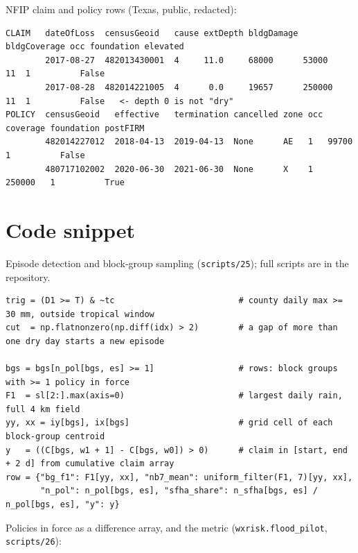 \documentclass[11pt]{article}
\newcommand{\tc}[1]{\texttt{#1}}
\begin{document}
NFIP claim and policy rows (Texas, public, redacted):

\begin{lstlisting}[basicstyle=\ttfamily\scriptsize,language={}]
CLAIM   dateOfLoss  censusGeoid   cause extDepth bldgDamage bldgCoverage occ foundation elevated
        2017-08-27  482013430001  4     11.0     68000      53000        11  1          False
        2017-08-28  482014221005  4      0.0     19657      250000       11  1          False   <- depth 0 is not "dry"
POLICY  censusGeoid   effective   termination cancelled zone occ coverage foundation postFIRM
        482014227012  2018-04-13  2019-04-13  None      AE   1   99700    1          False
        480717102002  2020-06-30  2021-06-30  None      X    1   250000   1          True
\end{lstlisting}

\section{Code snippet}

Episode detection and block-group sampling (\tc{scripts/25}); full scripts are in the repository.

\begin{lstlisting}
trig = (D1 >= T) & ~tc                         # county daily max >= 30 mm, outside tropical window
cut  = np.flatnonzero(np.diff(idx) > 2)        # a gap of more than one dry day starts a new episode

bgs = bgs[n_pol[bgs, es] >= 1]                 # rows: block groups with >= 1 policy in force
F1  = sl[2:].max(axis=0)                       # largest daily rain, full 4 km field
yy, xx = iy[bgs], ix[bgs]                      # grid cell of each block-group centroid
y   = ((C[bgs, w1 + 1] - C[bgs, w0]) > 0)      # claim in [start, end + 2 d] from cumulative claim array
row = {"bg_f1": F1[yy, xx], "nb7_mean": uniform_filter(F1, 7)[yy, xx],
       "n_pol": n_pol[bgs, es], "sfha_share": n_sfha[bgs, es] / n_pol[bgs, es], "y": y}
\end{lstlisting}

Policies in force as a difference array, and the metric (\tc{wxrisk.flood\_pilot}, \tc{scripts/26}):
\end{document}
